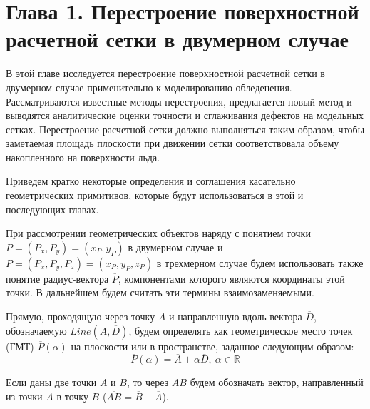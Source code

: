 \newpage
\section*{Глава 1. Перестроение поверхностной расчетной сетки в двумерном случае} %
\addtocounter{section}{1}                                                                             %
\setcounter{subsection}{0}
\setcounter{figure}{0}
\setcounter{equation}{0}
\setcounter{table}{0}
\setcounter{theorem}{0}
\setcounter{lemma}{0}
\setcounter{definition}{0}

В этой главе исследуется перестроение поверхностной расчетной сетки в двумерном случае применительно к моделированию обледенения.
Рассматриваются известные методы перестроения, предлагается новый метод и выводятся аналитические оценки точности и сглаживания дефектов на модельных сетках.
Перестроение расчетной сетки должно выполняться таким образом, чтобы заметаемая площадь плоскости при движении сетки соответствовала объему накопленного на поверхности льда.

Приведем кратко некоторые определения и соглашения касательно геометрических примитивов, которые будут использоваться в этой и последующих главах.

При рассмотрении геометрических объектов наряду с понятием точки $P = (P_x, P_y) = (x_P, y_P)$ в двумерном случае и $P = (P_x, P_y, P_z) = (x_P, y_P, z_P)$ в трехмерном случае будем использовать также понятие радиус-вектора $\overline{P}$, компонентами которого являются координаты этой точки.
В дальнейшем будем считать эти термины взаимозаменяемыми.

Прямую, проходящую через точку $A$ и направленную вдоль вектора $\overline{D}$, обозначаемую $Line(A, \overline{D})$, будем определять как геометрическое место точек (ГМТ) $\overline{P}(\alpha)$ на плоскости или в пространстве, заданное следующим образом:
\begin{equation}\label{eqn:text_1_geo_prim_line}
	\overline{P}(\alpha) = \overline{A} + \alpha \overline{D}, \ \alpha \in \mathbb{R}
\end{equation}

Если даны две точки $A$ и $B$, то через $\overline{AB}$ будем обозначать вектор, направленный из точки $A$ в точку $B$ ($\overline{AB} = \overline{B} - \overline{A}$).

